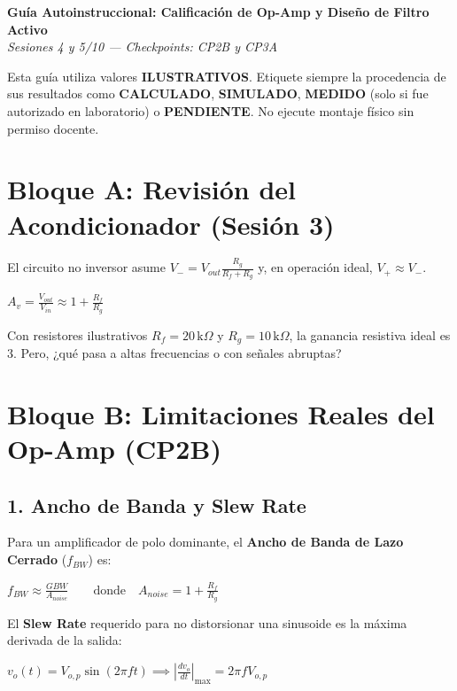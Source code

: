 \documentclass[11pt, a4paper]{article}
\begin{document}
\begin{center}
    {\Large \textbf{Guía Autoinstruccional: Calificación de Op-Amp y Diseño de Filtro Activo}} \\
    \vspace{0.2cm}
    \textit{Sesiones 4 y 5/10 — Checkpoints: CP2B y CP3A}
\end{center}

\begin{tcolorbox}[colback=red!5, colframe=red!80!black, title=\textbf{Declaración de Integridad}]
    Esta guía utiliza valores \textbf{ILUSTRATIVOS}. Etiquete siempre la procedencia de sus resultados como \textbf{CALCULADO}, \textbf{SIMULADO}, \textbf{MEDIDO} (solo si fue autorizado en laboratorio) o \textbf{PENDIENTE}. No ejecute montaje físico sin permiso docente.
\end{tcolorbox}

\section{Bloque A: Revisión del Acondicionador (Sesión 3)}
El circuito no inversor asume $V_- = V_{out} \frac{R_g}{R_f + R_g}$ y, en operación ideal, $V_+ \approx V_-$.
{\centering $\displaystyle A_v = \frac{V_{out}}{V_{in}} \approx 1 + \frac{R_f}{R_g}$ \par}
\vspace{0.2cm}
Con resistores ilustrativos $R_f=20\,\text{k}\Omega$ y $R_g=10\,\text{k}\Omega$, la ganancia resistiva ideal es $3$. Pero, ¿qué pasa a altas frecuencias o con señales abruptas?

\section{Bloque B: Limitaciones Reales del Op-Amp (CP2B)}

\subsection{1. Ancho de Banda y Slew Rate}
Para un amplificador de polo dominante, el \textbf{Ancho de Banda de Lazo Cerrado} ($f_{BW}$) es:
{\centering $\displaystyle f_{BW} \approx \frac{GBW}{A_{noise}} \qquad \text{donde} \quad A_{noise} = 1 + \frac{R_f}{R_g}$ \par}

El \textbf{Slew Rate} requerido para no distorsionar una sinusoide es la máxima derivada de la salida:
{\centering $\displaystyle v_o(t) = V_{o,p}\sin(2\pi f t) \implies \left| \frac{dv_o}{dt} \right|_{\max} = 2\pi f V_{o,p}$ \par}
\end{document}

